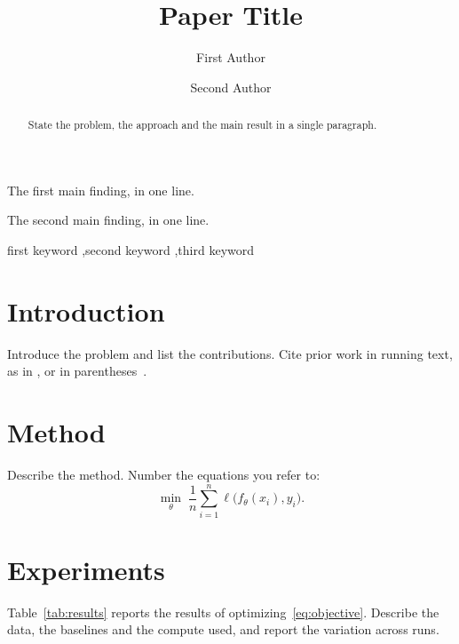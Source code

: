 \documentclass[preprint,12pt]{elsarticle}
\begin{document}
\begin{frontmatter}

\title{Paper Title}

\author[uni]{First Author}

\author[inst]{Second Author}



\begin{abstract}
State the problem, the approach and the main result in a single
paragraph.
\end{abstract}

\begin{highlights}
\item The first main finding, in one line.
\item The second main finding, in one line.
\end{highlights}

\begin{keyword}
first keyword \sep second keyword \sep third keyword
\end{keyword}

\end{frontmatter}

\section{Introduction}
\label{sec:intro}
Introduce the problem and list the contributions. Cite prior work in
running text, as in \citet{knuth1984texbook}, or in
parentheses~\citep{lamport1994latex}.

\section{Method}
\label{sec:method}
Describe the method. Number the equations you refer to:
\begin{equation}
  \label{eq:objective}
  \min_{\theta} \; \frac{1}{n} \sum_{i=1}^{n} \ell\bigl(f_\theta(x_i), y_i\bigr) .
\end{equation}

\section{Experiments}
\label{sec:experiments}
Table~\ref{tab:results} reports the results of
optimizing~\eqref{eq:objective}. Describe the data, the baselines and the
compute used, and report the variation across runs.
\end{document}
